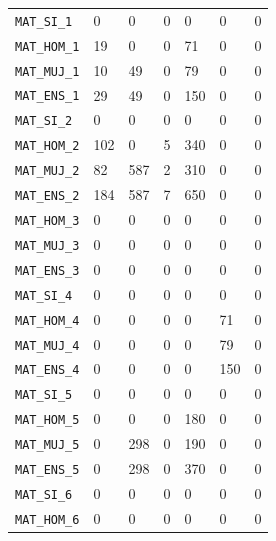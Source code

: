 \documentclass[10pt]{article}
\begin{document}
\begin{xltabular}{\linewidth}{@{}p{4.3cm} Y Y Y Y Y Y @{}}
\texttt{MAT\_\allowbreak{}SI\_\allowbreak{}1} & 0 & 0 & 0 & 0 & 0 & 0 \\
\texttt{MAT\_\allowbreak{}HOM\_\allowbreak{}1} & 19 & 0 & 0 & 71 & 0 & 0 \\
\texttt{MAT\_\allowbreak{}MUJ\_\allowbreak{}1} & 10 & 49 & 0 & 79 & 0 & 0 \\
\texttt{MAT\_\allowbreak{}ENS\_\allowbreak{}1} & 29 & 49 & 0 & 150 & 0 & 0 \\
\texttt{MAT\_\allowbreak{}SI\_\allowbreak{}2} & 0 & 0 & 0 & 0 & 0 & 0 \\
\texttt{MAT\_\allowbreak{}HOM\_\allowbreak{}2} & 102 & 0 & 5 & 340 & 0 & 0 \\
\texttt{MAT\_\allowbreak{}MUJ\_\allowbreak{}2} & 82 & 587 & 2 & 310 & 0 & 0 \\
\texttt{MAT\_\allowbreak{}ENS\_\allowbreak{}2} & 184 & 587 & 7 & 650 & 0 & 0 \\
\texttt{MAT\_\allowbreak{}HOM\_\allowbreak{}3} & 0 & 0 & 0 & 0 & 0 & 0 \\
\texttt{MAT\_\allowbreak{}MUJ\_\allowbreak{}3} & 0 & 0 & 0 & 0 & 0 & 0 \\
\texttt{MAT\_\allowbreak{}ENS\_\allowbreak{}3} & 0 & 0 & 0 & 0 & 0 & 0 \\
\texttt{MAT\_\allowbreak{}SI\_\allowbreak{}4} & 0 & 0 & 0 & 0 & 0 & 0 \\
\texttt{MAT\_\allowbreak{}HOM\_\allowbreak{}4} & 0 & 0 & 0 & 0 & 71 & 0 \\
\texttt{MAT\_\allowbreak{}MUJ\_\allowbreak{}4} & 0 & 0 & 0 & 0 & 79 & 0 \\
\texttt{MAT\_\allowbreak{}ENS\_\allowbreak{}4} & 0 & 0 & 0 & 0 & 150 & 0 \\
\texttt{MAT\_\allowbreak{}SI\_\allowbreak{}5} & 0 & 0 & 0 & 0 & 0 & 0 \\
\texttt{MAT\_\allowbreak{}HOM\_\allowbreak{}5} & 0 & 0 & 0 & 180 & 0 & 0 \\
\texttt{MAT\_\allowbreak{}MUJ\_\allowbreak{}5} & 0 & 298 & 0 & 190 & 0 & 0 \\
\texttt{MAT\_\allowbreak{}ENS\_\allowbreak{}5} & 0 & 298 & 0 & 370 & 0 & 0 \\
\texttt{MAT\_\allowbreak{}SI\_\allowbreak{}6} & 0 & 0 & 0 & 0 & 0 & 0 \\
\texttt{MAT\_\allowbreak{}HOM\_\allowbreak{}6} & 0 & 0 & 0 & 0 & 0 & 0 \\

\end{xltabular}
\end{document}
